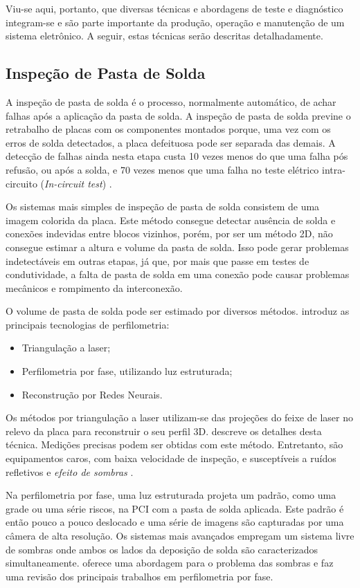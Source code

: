 Viu-se aqui, portanto, que diversas técnicas e abordagens de teste e diagnóstico integram-se e são parte importante da produção, operação e manutenção de um sistema eletrônico. A seguir, estas técnicas serão descritas detalhadamente. 
\clearpage
\subsection{Inspeção de Pasta de Solda}

A inspeção de pasta de solda é o processo, normalmente automático, de achar falhas após a aplicação da pasta de solda. A inspeção de pasta de solda previne o retrabalho de placas com os componentes montados porque, uma vez com os erros de solda detectados, a placa defeituosa pode ser separada das demais. A detecção de falhas ainda nesta etapa custa 10 vezes menos do que uma falha pós refusão, ou após a solda, e 70 vezes menos que uma falha no teste elétrico intra-circuito (\textit{In-circuit test}) \citep{owen2000process}.

Os sistemas mais simples de inspeção de pasta de solda consistem de uma imagem colorida da placa. Este método consegue detectar ausência de solda e conexões indevidas entre blocos vizinhos, porém, por ser um método 2D, não consegue estimar a altura e volume da pasta de solda. Isso pode gerar problemas indetectáveis em outras etapas, já que, por mais que passe em testes de condutividade, a falta de pasta de solda em uma conexão pode causar problemas mecânicos e rompimento da interconexão. 

O volume de pasta de solda pode ser estimado por diversos métodos. \citet{5246351} introduz as principais tecnologias de perfilometria: 
\begin{itemize}
    \item Triangulação a laser;
    \item Perfilometria por fase, utilizando luz estruturada;
    \item Reconstrução por Redes Neurais.
\end{itemize}

Os métodos por triangulação a laser utilizam-se das projeções do feixe de laser no relevo da placa para reconstruir o seu perfil 3D.  \cite{5576321} descreve os detalhes desta técnica. Medições precisas podem ser obtidas com este método. Entretanto, são equipamentos caros, com baixa velocidade de inspeção, e susceptíveis a ruídos refletivos e \textit{efeito de sombras} \citep{5246351}.

Na perfilometria por fase, uma luz estruturada projeta um padrão, como uma grade ou uma série riscos, na PCI com a pasta de solda aplicada. Este padrão é então pouco a pouco deslocado e uma série de imagens são capturadas por uma câmera de alta resolução. Os sistemas mais avançados empregam um sistema livre de sombras onde ambos os lados da deposição de solda são caracterizados simultaneamente. \cite{5576321} oferece uma abordagem para o problema das sombras e \cite{5246351} faz uma revisão dos principais trabalhos em perfilometria por fase.

